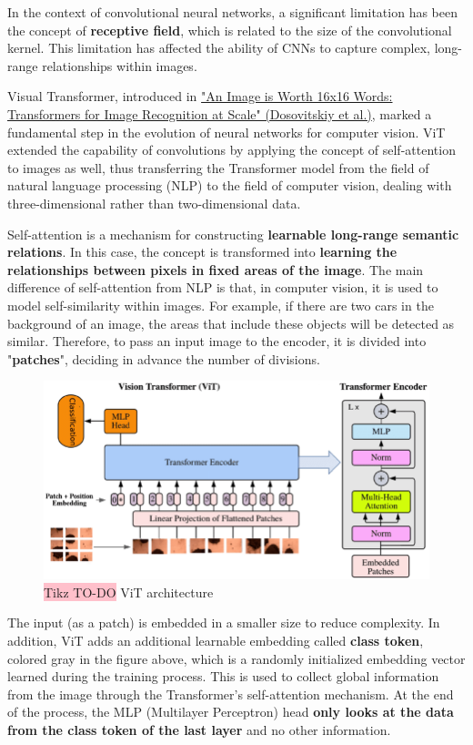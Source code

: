 In the context of convolutional neural networks, a significant limitation has been the concept of \textbf{receptive field}, which is related to the size of the convolutional kernel. This limitation has affected the ability of CNNs to capture complex, long-range relationships within images.

Visual Transformer, introduced in \href{https://arxiv.org/pdf/2010.11929}{"An Image is Worth 16x16 Words: Transformers for Image Recognition at Scale" (Dosovitskiy et al.)}, marked a fundamental step in the evolution of neural networks for computer vision. ViT extended the capability of convolutions by applying the concept of self-attention to images as well, thus transferring the Transformer model from the field of natural language processing (NLP) to the field of computer vision, dealing with three-dimensional rather than two-dimensional data.

Self-attention is a mechanism for constructing \textbf{learnable long-range semantic relations}. In this case, the concept is transformed into \textbf{learning the relationships between pixels in fixed areas of the image}. The main difference of self-attention from NLP is that, in computer vision, it is used to model self-similarity within images. For example, if there are two cars in the background of an image, the areas that include these objects will be detected as similar. Therefore, to pass an input image to the encoder, it is divided into "\textbf{patches}", deciding in advance the number of divisions.

\begin{figure}[H]
    \centering
    \includegraphics[width=\linewidth]{tikz/chapter8 - Vision Transformer.png}
    \caption{{\color{red}\colorbox{pink}{Tikz TO-DO}} ViT architecture}
\end{figure}

The input (as a patch) is embedded in a smaller size to reduce complexity. In addition, ViT adds an additional learnable embedding called \textbf{class token}, colored gray in the figure above, which is a randomly initialized embedding vector learned during the training process. This is used to collect global information from the image through the Transformer's self-attention mechanism. At the end of the process, the MLP (Multilayer Perceptron) head \textbf{only looks at the data from the class token of the last layer} and no other information.

